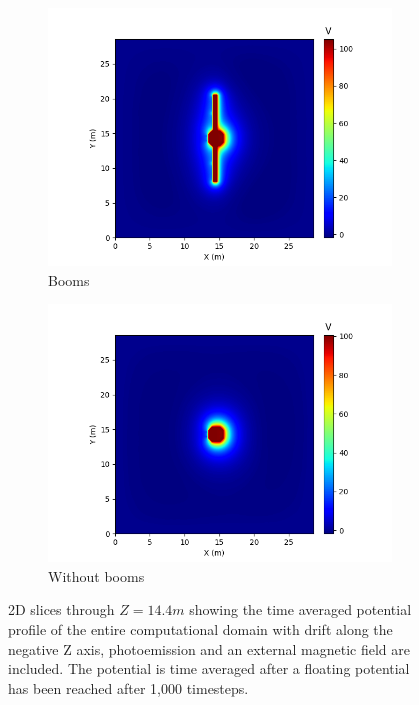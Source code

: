 \begin{figure}[H]
  \begin{subfigure}[b]{0.6\textwidth}
    \includegraphics[width=\textwidth]{figures/MMO/BField/WB/P_BField_WB.png}
    \caption{Booms}
    \label{fig:P_BField_WB}
  \end{subfigure}
  \hfill
  \begin{subfigure}[b]{0.6\textwidth}
    \includegraphics[width=\textwidth]{figures/MMO/BField/NB/P_BField_NB.png}
    \caption{Without booms}
    \label{fig:P_BField_NB}
  \end{subfigure}
  \caption{2D slices through $Z = 14.4 m$ showing the time averaged potential profile of the entire computational domain with drift along the negative Z axis, photoemission and an external magnetic field are included. The potential is time averaged after a floating potential has been reached after 1,000 timesteps.}
  \label{fig:Pot_BField}
\end{figure}

